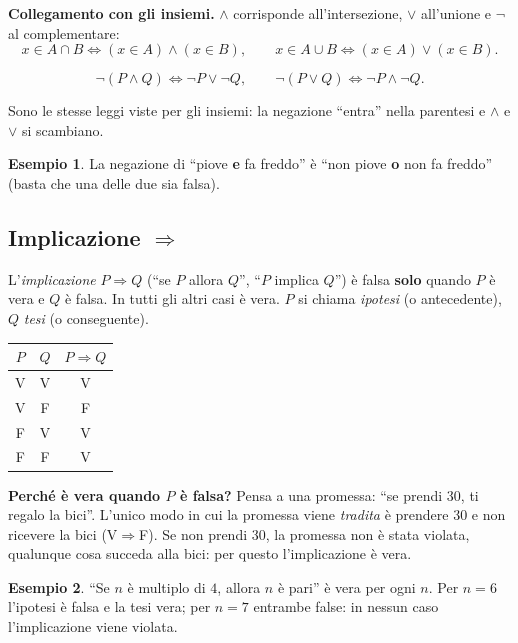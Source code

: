 \documentclass[11pt,a4paper]{article}
\theoremstyle{definition}
\newtheorem*{esempio}{Esempio}
\newcommand{\V}{\textsf{V}}
\newcommand{\F}{\textsf{F}}
\begin{document}
\textbf{Collegamento con gli insiemi.}
$\land$ corrisponde all'intersezione, $\lor$ all'unione e $\neg$ al
complementare:
\[
x \in A \cap B \iff (x \in A) \land (x \in B), \qquad
x \in A \cup B \iff (x \in A) \lor (x \in B).
\]

\begin{teorema}
\[
\neg(P \land Q) \iff \neg P \lor \neg Q, \qquad
\neg(P \lor Q) \iff \neg P \land \neg Q.
\]
\end{teorema}

Sono le stesse leggi viste per gli insiemi: la negazione ``entra'' nella
parentesi e $\land$ e $\lor$ si scambiano.

\begin{esempio}
La negazione di ``piove \textbf{e} fa freddo'' è ``non piove \textbf{o} non
fa freddo'' (basta che una delle due sia falsa).
\end{esempio}

\newpage
\subsection{Implicazione $\Rightarrow$}

\begin{definizione}
L'\emph{implicazione} $P \Rightarrow Q$ (``se $P$ allora $Q$'', ``$P$ implica
$Q$'') è falsa \textbf{solo} quando $P$ è vera e $Q$ è falsa. In tutti gli
altri casi è vera. $P$ si chiama \emph{ipotesi} (o antecedente), $Q$
\emph{tesi} (o conseguente).
\end{definizione}

\begin{center}
\begin{tabular}{cc|c}
$P$ & $Q$ & $P \Rightarrow Q$ \\ \hline
\V & \V & \V \\
\V & \F & \F \\
\F & \V & \V \\
\F & \F & \V
\end{tabular}
\end{center}

\textbf{Perché è vera quando $P$ è falsa?} Pensa a una promessa: ``se
prendi 30, ti regalo la bici''. L'unico modo in cui la promessa viene
\emph{tradita} è prendere 30 e non ricevere la bici (\V$\Rightarrow$\F).
Se non prendi 30, la promessa non è stata violata, qualunque cosa succeda
alla bici: per questo l'implicazione è vera.

\begin{esempio}
``Se $n$ è multiplo di $4$, allora $n$ è pari'' è vera per ogni $n$.
Per $n = 6$ l'ipotesi è falsa e la tesi vera; per $n = 7$ entrambe false:
in nessun caso l'implicazione viene violata.
\end{esempio}
\end{document}
